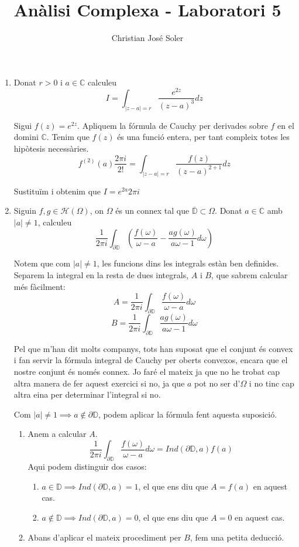 \documentclass[10pt,a4paper]{article}
\author{Christian José Soler}
\title{Anàlisi Complexa - Laboratori 5}
\begin{document}
\maketitle

\begin{enumerate}
\item Donat $r>0$ i $a\in\mathbb{C}$ calculeu
$$I=\int_{|z-a|=r}\frac{e^{2z}}{(z-a)^{3}}dz$$
\begin{framed}
Sigui $f(z) = e^{2z}$.
Apliquem la fórmula de Cauchy per derivades sobre $f$ en el domini $\mathbb{C}$. Tenim que $f(z)$ és una funció entera, per tant compleix totes les hipòtesis necessàries.
$$f^{(2)}(a) \frac{2\pi i}{2!} = \int_{|z-a|=r}\frac{f(z)}{(z-a)^{2+1}}dz$$

Sustituïm i obtenim que $I=e^{2a}2\pi i$
\end{framed}
\item Siguin $f,g\in\mathcal{H}(\Omega)$, on $\Omega$ és un connex tal que $\overline{\mathbb{D}}\subset \Omega$. Donat $a\in\mathbb{C}$ amb $|a|\neq 1$, calculeu
$$\frac{1}{2\pi i}\int_{\partial\mathbb{D}}\left( \frac{f(\omega)}{\omega - a} - \frac{ag(\omega)}{a\omega - 1} d\omega\right) $$ 
\begin{framed}
Notem que com $|a|\neq 1$, les funcions dins les integrals estàn ben definides.
Separem la integral en la resta de dues integrals, $A$ i $B$, que sabrem calcular més fàcilment:
$$A=\frac{1}{2\pi i}\int_{\partial\mathbb{D}}\frac{f(\omega)}{\omega - a} d\omega$$
$$B=\frac{1}{2\pi i}\int_{\partial\mathbb{D}}\frac{ag(\omega)}{a\omega - 1} d\omega$$

Pel que m'han dit molts companys, tots han suposat que el conjunt és convex i fan servir la fórmula integral de Cauchy per oberts convexos, encara que el nostre conjunt és només connex. Jo faré el mateix ja que no he trobat cap altra manera de fer aquest exercici si no, ja que $a$ pot no ser d'$\Omega$ i no tinc cap altra eina per determinar l'integral si no.

Com $|a|\neq 1 \implies a\notin\partial\mathbb{D}$, podem aplicar la fórmula fent aquesta suposició.

\begin{enumerate}
	\item Anem a calcular $A$.
	$$\frac{1}{2\pi i}\int_{\partial\mathbb{D}}\frac{f(\omega)}{\omega - a} d\omega
	= Ind(\partial\mathbb{D},a)f(a)$$
	Aqui podem distinguir dos casos:
	\begin{enumerate}
		\item $a\in\mathbb{D} \implies Ind(\partial\mathbb{D},a)=1$, el que ens diu que $A=f(a)$ en aquest cas.
		\item $a\notin\mathbb{D} \implies Ind(\partial\mathbb{D},a)=0$, el que ens diu que $A=0$ en aquest cas.
	\end{enumerate}
	\item Abans d'aplicar el mateix procediment per $B$, fem una petita deducció.
	

\end{enumerate}
\end{framed}
\end{enumerate}
\end{document}
